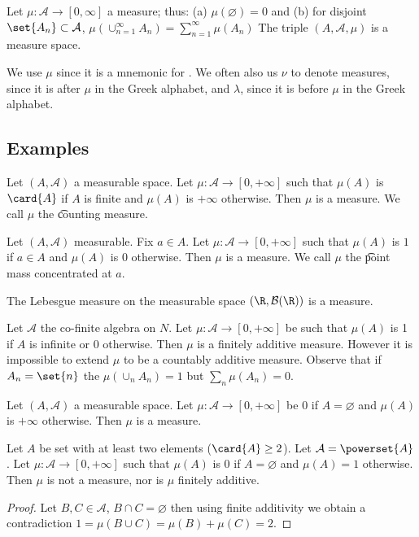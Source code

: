 Let $\mu : \mathcal{A}  \to [0, \infty]$ a measure;
thus:
(a) $\mu (\varnothing) = 0$ and
(b) for disjoint $\set{A_n} \subset \mathcal{A} $,
$\mu (\cup_{n = 1}^{\infty} A_n) = \sum_{n = 1}^{\infty} \mu (A_n)$
The triple $(A, \mathcal{A} , \mu )$ is a measure space.

We use $\mu $ since it is a mnemonic for .
We often also us $\nu $ to denote measures, since it is after $\mu $ in the Greek alphabet, and $\lambda $, since it is before $\mu $ in the Greek alphabet.

\subsection*{Examples}

\begin{example}
Let $(A, \mathcal{A} )$ a measurable space.
Let $\mu : \mathcal{A}  \to [0, +\infty]$ such that $\mu (A)$ is $\card{A}$ if $A$ is finite and $\mu (A)$ is $+\infty$ otherwise.
Then $\mu $ is a measure.
We call $\mu $ the \t{counting measure}.\end{example}
\begin{example}
Let $(A, \mathcal{A} )$ measurable.
Fix $a \in A$.
Let $\mu : \mathcal{A}  \to [0, +\infty]$ such that $\mu (A)$ is $1$ if $a \in A$ and $\mu (A)$ is $0$ otherwise.
Then $\mu $ is a measure.
We call $\mu $ the \t{point mass} concentrated at $a$.\end{example}
\begin{expl}
The Lebesgue measure on the measurable space $(\R , \mathcal{B} (\R ))$ is a measure.
\end{expl}

\begin{expl}
Let $\mathcal{A} $ the co-finite algebra on $N$.
Let $\mu : \mathcal{A}  \to [0, +\infty]$ be such that $\mu (A)$ is 1 if $A$ is infinite or 0 otherwise.
Then $\mu $ is a finitely additive measure.
However it is impossible to extend $\mu $ to be a countably additive measure.
Observe that if $A_n = \set{n}$ the $\mu (\cup_{n} A_n) = 1$ but $\sum_{n} \mu (A_n) = 0$.
\end{expl}

\begin{expl}
Let $(A, \mathcal{A} )$ a measurable space.
Let $\mu : \mathcal{A}  \to [0, +\infty]$ be $0$ if $A = \varnothing$ and $\mu (A)$ is $+\infty$ otherwise.
Then $\mu $ is a measure.
\end{expl}

\begin{expl}
Let $A$ be set with at least two elements ($\card{A} \geq 2$).
Let $\mathcal{A}  = \powerset{A}$.
Let $\mu : \mathcal{A}  \to [0, +\infty]$ such that $\mu (A)$ is $0$ if $A = \varnothing$ and $\mu (A) = 1$ otherwise.
Then $\mu $ is not a measure, nor is $\mu $ finitely additive.
\begin{proof}
Let $B, C \in \mathcal{A} $,
$B \cap  C = \varnothing$
then using finite additivity
we obtain a contradiction
$
1 = μ(B \cup C) = μ(B) + μ(C) = 2
$.
\end{proof}
\end{expl}


